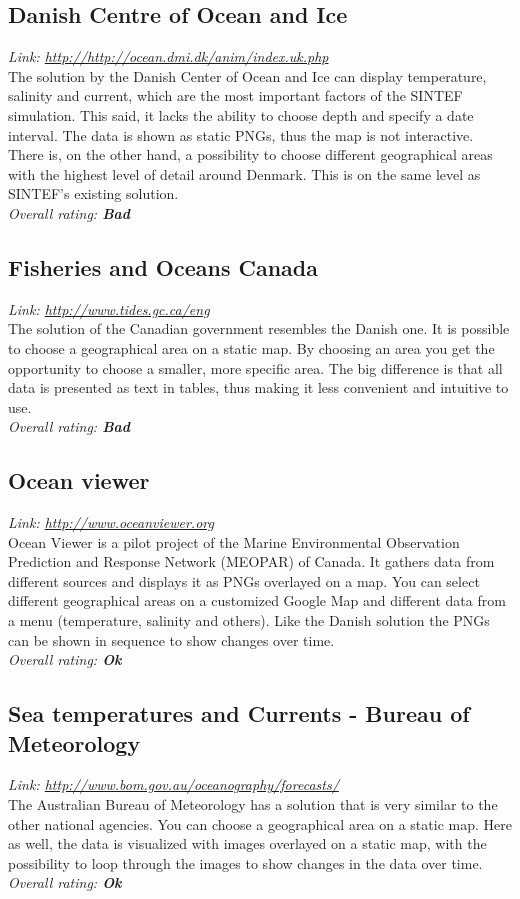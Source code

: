 \documentclass[11pt,a4paper,titlepage,oneside]{report}
\begin{document}
\subsection{Danish Centre of Ocean and Ice}
  \emph{Link: \url{http://http://ocean.dmi.dk/anim/index.uk.php }} \\%
    The solution by the Danish Center of Ocean and Ice can display temperature, salinity and current, which are the most important factors of the SINTEF simulation. This said, it lacks the ability to choose depth and specify a date interval. The data is shown as static PNGs, thus the map is not interactive. There is, on the other hand, a possibility to choose different geographical areas with the highest level of detail around Denmark. This is on the same level as SINTEF's existing solution.
  \\ \emph{Overall rating: \textbf{Bad}}

  \subsection{Fisheries and Oceans Canada}
  \emph{Link: \url{http://www.tides.gc.ca/eng}} \\%
    The solution of the Canadian government resembles the Danish one. It is possible to choose a geographical area on a static map. By choosing an area you get the opportunity to choose a smaller, more specific area. The big difference is that all data is presented as text in tables, thus making it less convenient and intuitive to use.
  \\ \emph{Overall rating: \textbf{Bad}}

  \subsection{Ocean viewer}
  \emph{Link: \url{http://www.oceanviewer.org}} \\%
    Ocean Viewer is a pilot project of the Marine Environmental Observation Prediction and Response Network (MEOPAR) of Canada. It gathers data from different sources and displays it as PNGs overlayed on a map. You can select different geographical areas on a customized Google Map and different data from a menu (temperature, salinity and others). Like the Danish solution the PNGs can be shown in sequence to show changes over time.
  \\ \emph{Overall rating: \textbf{Ok}}

  \subsection{Sea temperatures and Currents - Bureau of Meteorology}
  \emph{Link: \url{http://www.bom.gov.au/oceanography/forecasts/}} \\%
    The Australian Bureau of Meteorology has a solution that is very similar to the other national agencies. You can choose a geographical area on a static map. Here as well, the data is visualized with images overlayed on a static map, with the possibility to loop through the images to show changes in the data over time.
  \\ \emph{Overall rating: \textbf{Ok}}
  
\end{document}
